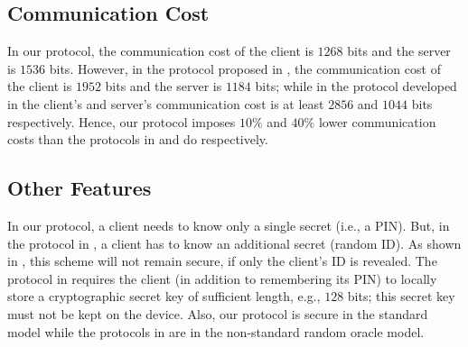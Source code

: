 \vspace{-4mm}
\subsection{Communication Cost}
\vspace{-2mm}

In our protocol, the communication cost of the client is $1268$ bits and the server is $1536$ bits. However, in the protocol proposed in \cite{WangW18},  the communication cost of the client is $1952$ bits and the server is  $1184$ bits; while in the protocol developed in \cite{JareckiJKSS21} the client's and server's communication cost is at least $2856$ and $1044$ bits respectively. Hence, our protocol imposes $10\%$ and $40\%$ lower communication costs than the protocols in \cite{WangW18} and \cite{JareckiJKSS21} do respectively.


\vspace{-4mm}
\subsection{Other Features}
\vspace{-2mm}
 In our protocol, a client needs to know only a single secret (i.e., a  PIN). But, in the protocol in \cite{WangW18}, a client has to know an additional secret (random ID). As shown in \cite{Scott12a}, this scheme will not remain secure, if only the client's ID is revealed. The protocol in \cite{JareckiJKSS21} requires the client (in addition to remembering its PIN) to locally store a cryptographic secret key of sufficient length, e.g., $128$ bits; this secret key must not be kept on the device. 
 Also, our protocol is secure in the standard model while the protocols in \cite{WangW18,JareckiJKSS21} are in the non-standard random oracle model. 

